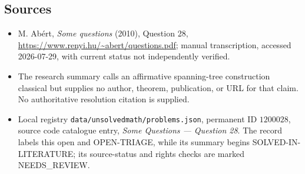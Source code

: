 \documentclass[11pt]{article}
\begin{document}
\subsection{Sources}
\begin{itemize}
\item M. Ab\'ert, \emph{Some questions} (2010), Question 28, \url{https://www.renyi.hu/~abert/questions.pdf}; manual transcription, accessed 2026-07-29, with current status not independently verified.
\item The research summary calls an affirmative spanning-tree construction classical but supplies no author, theorem, publication, or URL for that claim. No authoritative resolution citation is supplied.
\item Local registry \texttt{data/unsolvedmath/problems.json}, permanent ID $1200028$, source code catalogue entry, \emph{Some Questions --- Question 28}. The record labels this open and OPEN-TRIAGE, while its summary begins SOLVED-IN-LITERATURE; its source-status and rights checks are marked NEEDS\_REVIEW.
\end{itemize}
\end{document}
